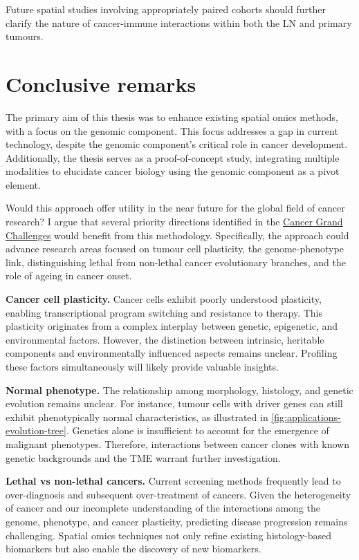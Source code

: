 Future spatial studies involving appropriately paired cohorts should further clarify the nature of cancer-immune interactions within both the \ac{LN} and primary tumours.

\section{Conclusive remarks}

The primary aim of this thesis was to enhance existing spatial omics methods, with a focus on the genomic component. This focus addresses a gap in current technology, despite the genomic component's critical role in cancer development. Additionally, the thesis serves as a proof-of-concept study, integrating multiple modalities to elucidate cancer biology using the genomic component as a pivot element. 

Would this approach offer utility in the near future for the global field of cancer research? I argue that several priority directions identified in the \href{https://cancergrandchallenges.org/}{Cancer Grand Challenges} would benefit from this methodology. Specifically, the approach could advance research areas focused on tumour cell plasticity, the genome-phenotype link, distinguishing lethal from non-lethal cancer evolutionary branches, and the role of ageing in cancer onset.

\textbf{Cancer cell plasticity.} Cancer cells exhibit poorly understood plasticity, enabling transcriptional program switching and resistance to therapy. This plasticity originates from a complex interplay between genetic, epigenetic, and environmental factors. However, the distinction between intrinsic, heritable components and environmentally influenced aspects remains unclear. Profiling these factors simultaneously will likely provide valuable insights.

\textbf{Normal phenotype.} The relationship among morphology, histology, and genetic evolution remains unclear. For instance, tumour cells with driver genes can still exhibit phenotypically normal characteristics, as illustrated in \cref{fig:applications-evolution-tree}. Genetics alone is insufficient to account for the emergence of malignant phenotypes. Therefore, interactions between cancer clones with known genetic backgrounds and the \ac{TME} warrant further investigation.

\textbf{Lethal vs non-lethal cancers.} Current screening methods frequently lead to over-diagnosis and subsequent over-treatment of cancers. Given the heterogeneity of cancer and our incomplete understanding of the interactions among the genome, phenotype, and cancer plasticity, predicting disease progression remains challenging. Spatial omics techniques not only refine existing histology-based biomarkers but also enable the discovery of new biomarkers.

